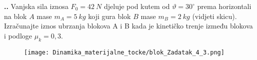 

\noindent 
\textbf{
\thecjelina.\thezadatak.}
Vanjska sila iznosa $F_0=42\ N$ djeluje pod kutem od $\vartheta = 30^\circ$ prema horizontali na blok $A$ mase $m_A=5 \ kg$ koji gura blok 
$B$ mase $m_B=2\ kg$ (vidjeti skicu). Izračunajte iznos ubrzanja blokova A i B kada je kinetičko trenje između blokova i podloge $\mu _k=0,3$.

\begin{figure}[h]%
  \begin{center}
    \texttt{[image: Dinamika\_materijalne\_tocke/blok\_Zadatak\_4\_3.png]}
  \end{center}
\end{figure}

